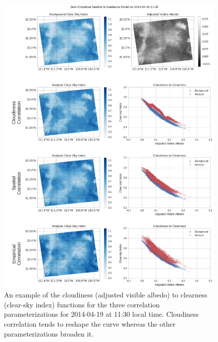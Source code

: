 \begin{figure}[p]
\centering
\includegraphics[width=\textwidth]{figs/cld_to_clear_Semi-Empirical_2014-04-19.png}
\caption[Clearness versus Cloudiness for SE model on 4/19]{An example
  of the cloudiness (adjusted visible albedo) to clearness (clear-sky
  index) functions for the three correlation parameterizations for
  2014-04-19 at 11:30 local time. Cloudiness correlation tends to
  reshape the curve whereas the other parameterizations broaden it.}
\label{fig:cldclr_se_419}
\end{figure}

